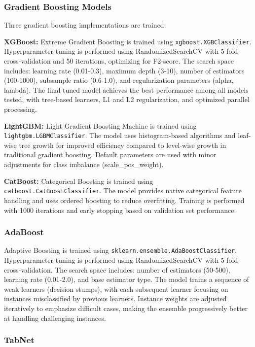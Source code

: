 \subsubsection{Gradient Boosting Models}

Three gradient boosting implementations are trained:

\textbf{XGBoost:} Extreme Gradient Boosting is trained using \texttt{xgboost.XGBClassifier}. Hyperparameter tuning is performed using RandomizedSearchCV with 5-fold cross-validation and 50 iterations, optimizing for F2-score. The search space includes: learning rate (0.01-0.3), maximum depth (3-10), number of estimators (100-1000), subsample ratio (0.6-1.0), and regularization parameters (alpha, lambda). The final tuned model achieves the best performance among all models tested, with tree-based learners, L1 and L2 regularization, and optimized parallel processing.

\textbf{LightGBM:} Light Gradient Boosting Machine is trained using \texttt{lightgbm.LGBMClassifier}. The model uses histogram-based algorithms and leaf-wise tree growth for improved efficiency compared to level-wise growth in traditional gradient boosting. Default parameters are used with minor adjustments for class imbalance (scale\_pos\_weight).

\textbf{CatBoost:} Categorical Boosting is trained using \texttt{catboost.CatBoostClassifier}. The model provides native categorical feature handling and uses ordered boosting to reduce overfitting. Training is performed with 1000 iterations and early stopping based on validation set performance.

\subsubsection{AdaBoost}

Adaptive Boosting is trained using \texttt{sklearn.ensemble.AdaBoostClassifier}. Hyperparameter tuning is performed using RandomizedSearchCV with 5-fold cross-validation. The search space includes: number of estimators (50-500), learning rate (0.01-2.0), and base estimator type. The model trains a sequence of weak learners (decision stumps), with each subsequent learner focusing on instances misclassified by previous learners. Instance weights are adjusted iteratively to emphasize difficult cases, making the ensemble progressively better at handling challenging instances.

\subsubsection{TabNet}

